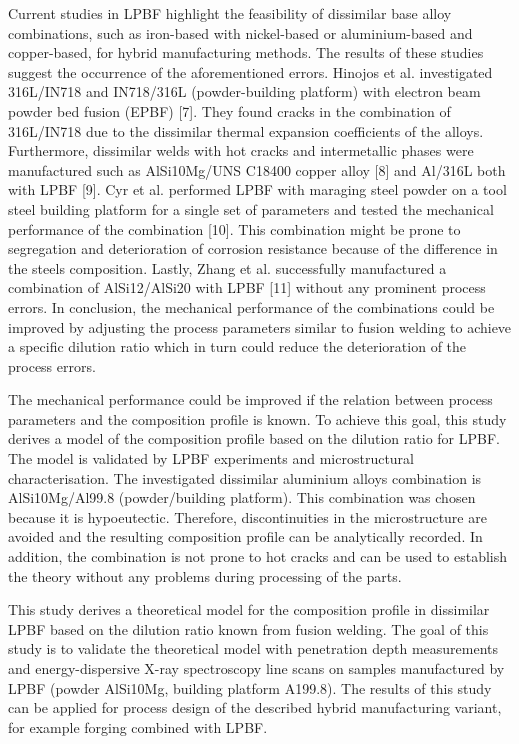 \documentclass[10pt]{article}
\begin{document}
Current studies in LPBF highlight the feasibility of dissimilar base alloy combinations, such as iron-based with nickel-based or aluminium-based and copper-based, for hybrid manufacturing methods. The results of these studies suggest the occurrence of the aforementioned errors. Hinojos et al. investigated 316L/IN718 and IN718/316L (powder-building platform) with electron beam powder bed fusion (EPBF) [7]. They found cracks in the combination of 316L/IN718 due to the dissimilar thermal expansion coefficients of the alloys. Furthermore, dissimilar welds with hot cracks and intermetallic phases were manufactured such as AlSi10Mg/UNS C18400 copper alloy [8] and Al/316L both with LPBF [9]. Cyr et al. performed LPBF with maraging steel powder on a tool steel building platform for a single set of parameters and tested the mechanical performance of the combination [10]. This combination might be prone to segregation and deterioration of corrosion resistance because of the difference in the steels composition. Lastly, Zhang et al. successfully manufactured a combination of AlSi12/AlSi20 with LPBF [11] without any prominent process errors. In conclusion, the mechanical performance of the combinations could be improved by adjusting the process parameters similar to fusion welding to achieve a specific dilution ratio which in turn could reduce the deterioration of the process errors.

The mechanical performance could be improved if the relation between process parameters and the composition profile is known. To achieve this goal, this study derives a model of the composition profile based on the dilution ratio for LPBF. The model is validated by LPBF experiments and microstructural characterisation. The investigated dissimilar aluminium alloys combination is AlSi10Mg/Al99.8 (powder/building platform). This combination was chosen because it is hypoeutectic. Therefore, discontinuities in the microstructure are avoided and the resulting composition profile can be analytically recorded. In addition, the combination is not prone to hot cracks and can be used to establish the theory without any problems during processing of the parts.

This study derives a theoretical model for the composition profile in dissimilar LPBF based on the dilution ratio known from fusion welding. The goal of this study is to validate the theoretical model with penetration depth measurements and energy-dispersive X-ray spectroscopy line scans on samples manufactured by LPBF (powder AlSi10Mg, building platform A199.8). The results of this study can be applied for process design of the described hybrid manufacturing variant, for example forging combined with LPBF.
\end{document}
